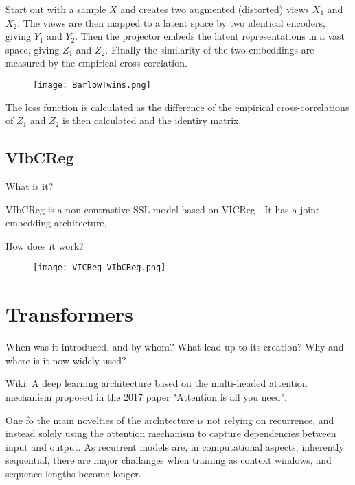 \documentclass[../../thesis.tex]{subfiles}
\begin{document}
Start out with a sample $X$ and creates two augmented (distorted) views $X_1$ and $X_2$. The views are then mapped to a latent space by two identical encoders, giving $Y_1$ and $Y_2$. Then the projector embeds the latent representations in a vast space, giving $Z_1$ and $Z_2$. Finally the similarity of the two embeddings are measured by the empirical cross-corelation.

\begin{figure}[h]
    \texttt{[image: BarlowTwins.png]}
    \centering    
    \caption{\cite{zbontar2021barlow}}
\end{figure}

The loss function is calculated as the difference of the empirical cross-correlations of $Z_1$ and $Z_2$ is then calculated and the identiry matrix. 


\subsection{VIbCReg}
What is it?

VIbCReg \cite{lee2024vibcreg} is a non-contrastive SSL model based on VICReg \cite{bardes2022vicreg}. It has a joint embedding architecture,

How does it work?


\begin{figure}[h]
    \texttt{[image: VICReg\_VIbCReg.png]}
    \centering    
    \caption{\cite{lee2024vibcreg}}
\end{figure}



\section{Transformers}

When was it introduced, and by whom?
What lead up to its creation?
Why and where is it now widely used? 


Wiki: A deep learning architecture based on the multi-headed attention mechanism proposed in the 2017 paper "Attention is all you need".

One fo the main novelties of the architecture is not relying on recurrence, and instead solely using the attention mechanism to capture dependencies between input and output. As recurrent models are, in computational aspects, inherently sequential, there are major challanges when training as context windows, and sequence lengths become longer. 
\end{document}

